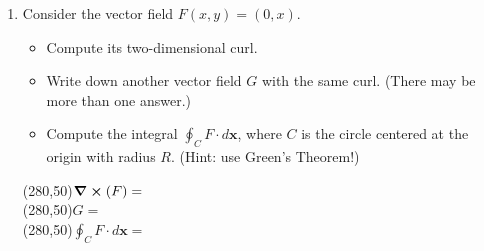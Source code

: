 \documentclass[12pt]{exam}
\begin{document}
\begin{enumerate}
\item Consider the vector field $F(x,y)=(0,x)$. 
\begin{itemize}
  \item Compute its two-dimensional curl.
  \item Write down another vector field $G$ with the same curl. (There may be more than one answer.)
  \item Compute the integral $\oint_C F\cdot d\mathbf{x}$, where $C$ is the circle centered at the origin with radius $R$. (Hint: use Green’s Theorem!)
\end{itemize}
\vfill
\begin{flushright}
\framebox(280,50){$\curl(F)=\phantom{aaaaadasdasdasdasdasdasdasdaasdasda}$}\\[6pt]
\framebox(280,50){$G=\phantom{aaaaadasdasdasdasdasdasdasdasdasdasdaasd}$}\\[6pt]
\framebox(280,50){$\oint_C F\cdot d\mathbf{x}=\phantom{aaaaadasdasdasdasdasdasdasdasdasdas}$}
\end{flushright}
\end{enumerate}
\end{document}

